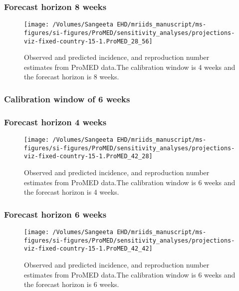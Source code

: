 \documentclass[9pt,twoside,lineno]{pnas-new}
\begin{document}
\subsubsection{Forecast horizon 8 weeks}\label{forecast-horizon-8-weeks-10}
\begin{figure}
  \centering
    \texttt{[image: /Volumes/Sangeeta EHD/mriids\_manuscript/ms-figures/si-figures/ProMED/sensitivity\_analyses/projections-viz-fixed-country-15-1.ProMED\_28\_56]} 
  \caption{Observed and predicted incidence, and reproduction number
    estimates from ProMED data.The calibration window is 4 weeks and
    the forecast horizon is 8 weeks.}
  \label{fig:pm48ul10}
\end{figure}\FloatBarrier


\subsubsection{Calibration window of 6 weeks}\label{calibration-window-of-6-weeks-3}


\subsubsection{Forecast horizon 4 weeks}\label{forecast-horizon-4-weeks-10}

\begin{figure}  
    \centering 
\texttt{[image: /Volumes/Sangeeta EHD/mriids\_manuscript/ms-figures/si-figures/ProMED/sensitivity\_analyses/projections-viz-fixed-country-15-1.ProMED\_42\_28]} 
  \caption{Observed and predicted incidence, and reproduction number
    estimates from ProMED data.The calibration window is 6 weeks and
    the forecast horizon is 4 weeks.}
  \label{fig:pm64ul10 }
\end{figure}\FloatBarrier


\subsubsection{Forecast horizon 6 weeks}\label{forecast-horizon-6-weeks-11}

\begin{figure}

  \centering 
\texttt{[image: /Volumes/Sangeeta EHD/mriids\_manuscript/ms-figures/si-figures/ProMED/sensitivity\_analyses/projections-viz-fixed-country-15-1.ProMED\_42\_42]} 
  \caption{Observed and predicted incidence, and reproduction number
    estimates from ProMED data.The calibration window is 6 weeks and
    the forecast horizon is 6 weeks.}
  \label{fig:pm66ul10}
\end{figure}\FloatBarrier
\end{document}

